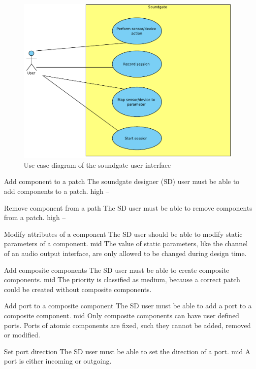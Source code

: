 	\begin{figure}[ht]
		\centering
			\includegraphics[width=\textwidth]{images/User_View.pdf}
		\caption{Use case diagram of the soundgate user interface}
		\label{fig:Soundgate_UserInterface}
	\end{figure}
	

	{Add component to a patch}
	{The soundgate designer (SD) user must be able to add components to a patch.}
	{high}
	{--}
	
	{Remove component from a path}
	{The SD user must be able to remove components from a patch.}
	{high}
	{--}
	
	{Modify attributes of a component}
	{The SD user should be able to modify static parameters of a component.}
	{mid}
	{The value of static parameters, like the channel of an audio output interface, are only allowed to be changed during design time.}
	
	{Add composite components}
	{The SD user must be able to create composite components.}
	{mid}
	{The priority is classified as medium, because a correct patch could be created without composite components. }
	
	{Add port to a composite component}
	{The SD user must be able to add a port to a composite component.}
	{mid}
	{Only composite components can have user defined ports. Ports of atomic components are fixed, such they cannot be added, removed or modified.}
	
	{Set port direction}
	{The SD user must be able to set the direction of a port.}
	{mid}
	{A port is either incoming or outgoing.}
	
